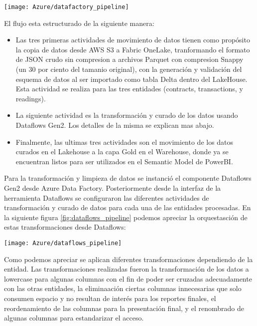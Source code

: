 \begin{center}
   \texttt{[image: Azure/datafactory\_pipeline]}
   \label{fig:datafactory_pipeline}
\end{center}

El flujo esta estructurado de la siguiente manera:
\begin{itemize}

	\item Las tres primeras actividades de movimiento de datos tienen como propósito la copia de datos desde AWS S3 a Fabric OneLake, tranformando el formato de JSON crudo sin compresion a archivos Parquet con compresion Snappy (un 30 por ciento del tamanio original), con la generación y validación del esquema de datos al ser importado como tabla Delta dentro del LakeHouse. Esta actividad se realiza para las tres entidades (contracts, transactions, y readings).
	
	\item La siguiente actividad es la transformación y curado de los datos usando Dataflows Gen2. Los detalles de la misma se explican mas abajo.
	
	\item Finalmente, las ultimas tres actividades son el movimiento de los datos curados en el Lakehouse a la capa Gold en el Warehouse, donde ya se encuentran listos para ser utilizados en el Semantic Model de PowerBI.
\end{itemize}

Para la transformación y limpieza de datos se instanció el componente Dataflows Gen2 desde Azure Data Factory. Posteriormente desde la interfaz de la herramienta Dataflows se configuraron las diferentes actividades de transformación y curado de datos para cada una de las entidades procesadas. En la siguiente figura \ref{fig:dataflows_pipeline} podemos apreciar la orquestasción de estas transformaciones desde Dataflows:

\begin{center}
   \texttt{[image: Azure/dataflows\_pipeline]}
   \label{fig:dataflows_pipeline}
\end{center}

Como podemos apreciar se aplican diferentes transformaciones dependiendo de la entidad. Las transformaciones realizadas fueron la transformación de los datos a lowercase para algunas columnas con el fin de poder ser cruzadas adecuadamente con las otras entidades, la eliminaación ciertas columnas innecesarias que solo consumen espacio y no resultan de interés para los reportes finales, el reordenamiento de las columnas para la presentación final, y el renombrado  de algunas columnas para estandarizar el acceso.
	
